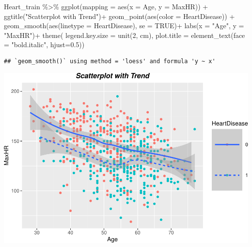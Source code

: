 \documentclass[
]{article}
\newenvironment{Shaded}{\begin{snugshade}}{\end{snugshade}}
\newcommand{\AttributeTok}[1]{\textcolor[rgb]{0.77,0.63,0.00}{#1}}
\newcommand{\ConstantTok}[1]{\textcolor[rgb]{0.00,0.00,0.00}{#1}}
\newcommand{\DecValTok}[1]{\textcolor[rgb]{0.00,0.00,0.81}{#1}}
\newcommand{\FloatTok}[1]{\textcolor[rgb]{0.00,0.00,0.81}{#1}}
\newcommand{\FunctionTok}[1]{\textcolor[rgb]{0.00,0.00,0.00}{#1}}
\newcommand{\NormalTok}[1]{#1}
\newcommand{\SpecialCharTok}[1]{\textcolor[rgb]{0.00,0.00,0.00}{#1}}
\newcommand{\StringTok}[1]{\textcolor[rgb]{0.31,0.60,0.02}{#1}}
\begin{document}
\begin{Shaded}
\begin{Highlighting}[]
\NormalTok{Heart\_train }\SpecialCharTok{\%\textgreater{}\%}
  \FunctionTok{ggplot}\NormalTok{(}\AttributeTok{mapping =} \FunctionTok{aes}\NormalTok{(}\AttributeTok{x =}\NormalTok{ Age, }\AttributeTok{y =}\NormalTok{ MaxHR)) }\SpecialCharTok{+} 
  \FunctionTok{ggtitle}\NormalTok{(}\StringTok{"Scatterplot with Trend"}\NormalTok{)}\SpecialCharTok{+}
  \FunctionTok{geom\_point}\NormalTok{(}\FunctionTok{aes}\NormalTok{(}\AttributeTok{color =}\NormalTok{ HeartDisease)) }\SpecialCharTok{+}
  \FunctionTok{geom\_smooth}\NormalTok{(}\FunctionTok{aes}\NormalTok{(}\AttributeTok{linetype =}\NormalTok{ HeartDisease), }\AttributeTok{se =} \ConstantTok{TRUE}\NormalTok{)}\SpecialCharTok{+}
  \FunctionTok{labs}\NormalTok{(}\AttributeTok{x =} \StringTok{"Age"}\NormalTok{, }\AttributeTok{y =} \StringTok{"MaxHR"}\NormalTok{)}\SpecialCharTok{+}
  \FunctionTok{theme}\NormalTok{( }\AttributeTok{legend.key.size =} \FunctionTok{unit}\NormalTok{(}\DecValTok{2}\NormalTok{, }\StringTok{\textquotesingle{}cm\textquotesingle{}}\NormalTok{),}
        \AttributeTok{plot.title =} \FunctionTok{element\_text}\NormalTok{(}\AttributeTok{face =} \StringTok{"bold.italic"}\NormalTok{, }\AttributeTok{hjust=}\FloatTok{0.5}\NormalTok{))}
\end{Highlighting}
\end{Shaded}

\begin{verbatim}
## `geom_smooth()` using method = 'loess' and formula 'y ~ x'
\end{verbatim}

\includegraphics{PSTAT-131--FINAL-PROJECT-_YIFAN-XU_files/figure-latex/unnamed-chunk-16-1.pdf}
\end{document}

